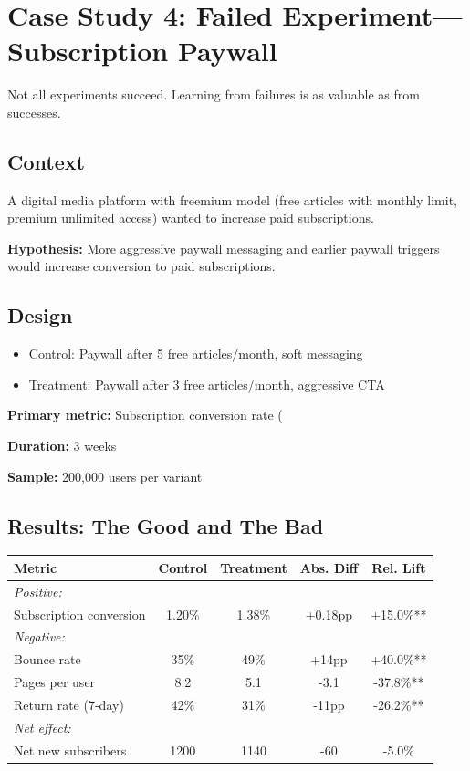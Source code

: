 \section{Case Study 4: Failed Experiment—Subscription Paywall}

Not all experiments succeed. Learning from failures is as valuable as from successes.

\subsection{Context}

A digital media platform with freemium model (free articles with monthly limit, premium unlimited access) wanted to increase paid subscriptions.

\textbf{Hypothesis:} More aggressive paywall messaging and earlier paywall triggers would increase conversion to paid subscriptions.

\subsection{Design}

\begin{itemize}
    \item Control: Paywall after 5 free articles/month, soft messaging
    \item Treatment: Paywall after 3 free articles/month, aggressive CTA
\end{itemize}

\textbf{Primary metric:} Subscription conversion rate (%

\textbf{Duration:} 3 weeks

\textbf{Sample:} 200,000 users per variant

\subsection{Results: The Good and The Bad}

\begin{center}
\begin{tabular}{lcccc}
\toprule
\textbf{Metric} & \textbf{Control} & \textbf{Treatment} & \textbf{Abs. Diff} & \textbf{Rel. Lift} \\
\midrule
\multicolumn{5}{l}{\textit{Positive:}} \\
Subscription conversion & 1.20\% & 1.38\% & +0.18pp & +15.0\%** \\
\midrule
\multicolumn{5}{l}{\textit{Negative:}} \\
Bounce rate & 35\% & 49\% & +14pp & +40.0\%** \\
Pages per user & 8.2 & 5.1 & -3.1 & -37.8\%** \\
Return rate (7-day) & 42\% & 31\% & -11pp & -26.2\%** \\
\midrule
\multicolumn{5}{l}{\textit{Net effect:}} \\
Net new subscribers & 1200 & 1140 & -60 & -5.0\% \\
\bottomrule
\end{tabular}
\end{center}

